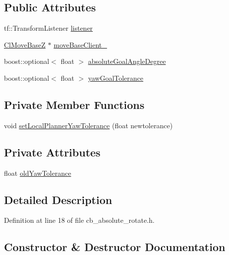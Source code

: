 \subsection*{Public Attributes}
\begin{DoxyCompactItemize}
\item 
tf\+::\+Transform\+Listener \hyperlink{classcl__move__base__z_1_1CbAbsoluteRotate_ad946bb6486dc35baf03ec1cc430a3406}{listener}
\item 
\hyperlink{classcl__move__base__z_1_1ClMoveBaseZ}{Cl\+Move\+BaseZ} $\ast$ \hyperlink{classcl__move__base__z_1_1CbAbsoluteRotate_a8ddbef73316ff96f30493b28b5627e35}{move\+Base\+Client\+\_\+}
\item 
boost\+::optional$<$ float $>$ \hyperlink{classcl__move__base__z_1_1CbAbsoluteRotate_ad5d0e21549940444e1cb525cda73329a}{absolute\+Goal\+Angle\+Degree}
\item 
boost\+::optional$<$ float $>$ \hyperlink{classcl__move__base__z_1_1CbAbsoluteRotate_a8d8b5b9c2c821efe101bb07c96c4bdd3}{yaw\+Goal\+Tolerance}
\end{DoxyCompactItemize}
\subsection*{Private Member Functions}
\begin{DoxyCompactItemize}
\item 
void \hyperlink{classcl__move__base__z_1_1CbAbsoluteRotate_aba8d93d615ccd43acd0684f8e88e2209}{set\+Local\+Planner\+Yaw\+Tolerance} (float newtolerance)
\end{DoxyCompactItemize}
\subsection*{Private Attributes}
\begin{DoxyCompactItemize}
\item 
float \hyperlink{classcl__move__base__z_1_1CbAbsoluteRotate_a2cfcd2978e7923494e2e66107e134e27}{old\+Yaw\+Tolerance}
\end{DoxyCompactItemize}


\subsection{Detailed Description}


Definition at line 18 of file cb\+\_\+absolute\+\_\+rotate.\+h.



\subsection{Constructor \& Destructor Documentation}

